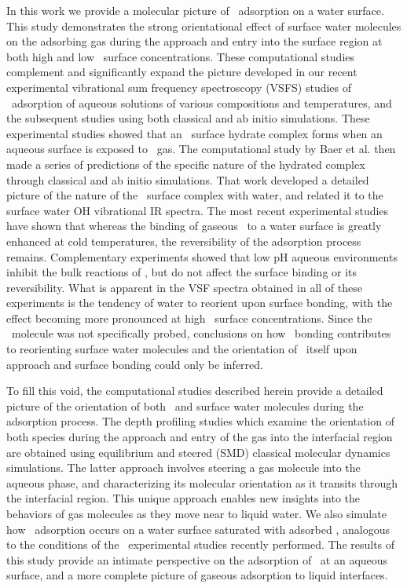 \documentclass{article}
\begin{document}
In this work we provide a molecular picture of \suldiox~adsorption on a water surface.  This study demonstrates the strong orientational effect of surface water molecules on the adsorbing gas during the approach and entry into the surface region at both high and low \suldiox~surface concentrations.  These computational studies complement and significantly expand the picture developed in our recent experimental vibrational sum frequency spectroscopy (VSFS) studies of \suldiox~adsorption of aqueous solutions of various compositions and temperatures,\cite{Tarbuck2005,Tarbuck2006} and the subsequent studies using both classical and ab initio simulations.  These experimental studies showed that an \suldiox~surface hydrate complex forms when an aqueous surface is exposed to \suldiox~gas. The computational study by Baer et al.\cite{Baer2010} then made a series of predictions of the specific nature of the hydrated complex through classical and ab initio simulations. That work developed a detailed picture of the nature of the \suldiox~surface complex with water, and related it to the surface water OH vibrational IR spectra.  The most recent experimental studies have shown that whereas the binding of gaseous \suldiox~to a water surface is greatly enhanced at cold temperatures, the reversibility of the adsorption process remains.\cite{Ota2011}  Complementary experiments showed that low pH aqueous environments inhibit the bulk reactions of \suldiox, but do not affect the surface binding or its reversibility.  What is apparent in the VSF spectra obtained in all of these experiments is the tendency of water to reorient upon surface bonding, with the effect becoming more pronounced at high \suldiox~surface concentrations. Since the \suldiox~molecule was not specifically probed, conclusions on how \suldiox~bonding contributes to reorienting surface water molecules and the orientation of \suldiox~itself upon approach and surface bonding could only be inferred. 

To fill this void, the computational studies described herein provide a detailed picture of the orientation of both \suldiox~and surface water molecules during the adsorption process.  The depth profiling studies which examine the orientation of both species during the approach and entry of the gas into the interfacial region are obtained using equilibrium and steered (SMD) classical molecular dynamics simulations. The latter approach involves steering a gas molecule into the aqueous phase, and characterizing its molecular orientation as it transits through the interfacial region.  This unique approach enables new insights into the behaviors of gas molecules as they move near to liquid water. We also simulate how \suldiox~adsorption occurs on a water surface saturated with adsorbed \suldiox, analogous to the conditions of the \suldiox~experimental studies recently performed.\cite{Ota2011} The results of this study provide an intimate perspective on the adsorption of \suldiox~at an aqueous surface, and a more complete picture of gaseous adsorption to liquid interfaces.
\end{document}
